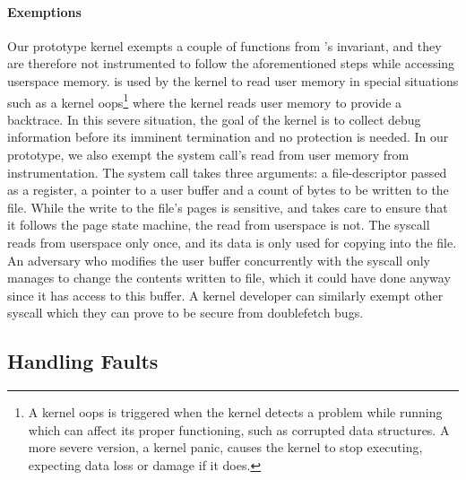 \documentclass[letterpaper,twocolumn,10pt, anonymous]{article}
\begin{document}
\paragraph{Exemptions}
Our prototype \tiktok kernel exempts a couple of functions 
from \tiktok's invariant, and they are therefore not instrumented 
to follow the aforementioned steps while accessing userspace
memory. 
 is used by the kernel to 
read user memory in special situations such as a kernel 
oops\footnote{A kernel oops is triggered when the kernel detects a 
problem while running which can affect its proper functioning, such 
as corrupted data structures. 
A more severe version, a kernel panic, causes the kernel to stop 
executing, expecting data loss or damage if it does.}
where the kernel reads user memory to provide a backtrace. 
In this severe situation, the goal of the kernel is to collect debug 
information before its imminent termination and no \tocttou protection 
is needed.
In our prototype, we also exempt the  system 
call's read from user memory from instrumentation.
The  system call takes three arguments: a 
file-descriptor passed as a register, a pointer to a user 
buffer and a count of bytes to be written to the file.
While the write to the file's pages is sensitive, and 
\tiktok takes care to ensure that it follows the page state 
machine, the read from userspace is not. 
The syscall reads from userspace only once, and its data 
is only used for copying into the file.
An adversary who modifies the user buffer concurrently with 
the syscall only manages to change the contents written to 
file, which it could have done anyway since it has access to 
this buffer.
A kernel developer can similarly exempt other syscall which 
they can prove to be secure from doublefetch bugs.


\subsection{Handling Faults}
\end{document}
